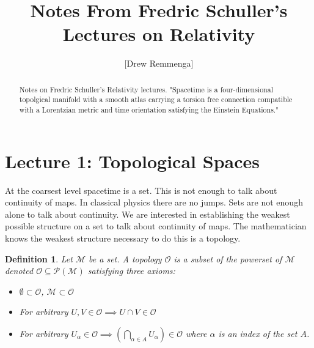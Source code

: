 \documentclass[10pt, oneside]{article}
\title{Notes From Fredric Schuller's Lectures on Relativity}
\author{[Drew Remmenga]}
\newtheorem{defn}{Definition}
\begin{document}
\maketitle
\begin{abstract}
   Notes on Fredric Schuller's Relativity lectures. "Spacetime is a four-dimensional topolgical manifold with a smooth atlas carrying a torsion free connection compatible with a Lorentzian metric and time orientation satisfying the Einstein Equations."
\end{abstract}
\section*{Lecture 1: Topological Spaces}
  At the coarsest level spacetime is a set. This is not enough to talk about continuity of maps. In classical physics there are no jumps. Sets are not enough alone to talk about continuity. We are interested in establishing the weakest possible structure on a set to talk about continuity of maps.
  The mathematician knows the weakest structure necessary to do this is a topology.
  \begin{defn}
      Let $\mathcal{M}$ be a set. A topology $\mathcal{O}$ is a subset of the powerset of $\mathcal{M}$ denoted $\mathcal{O} \subseteq \mathcal{P}(\mathcal{M})$ satisfying three axioms:
     \begin{itemize}
        \item $\emptyset \subset \mathcal{O}$, $\mathcal{M} \subset \mathcal{O}$
        \item For arbitrary $U, V \in \mathcal{O} \implies U \cap V \in \mathcal{O}$
        \item For arbitrary $U_\alpha \in \mathcal{O} \implies (\bigcap_{\alpha \in A} U_\alpha) \in \mathcal{O}$ where $\alpha$ is an index of the set $A$.
     \end{itemize}
  \end{defn}
\end{document}

